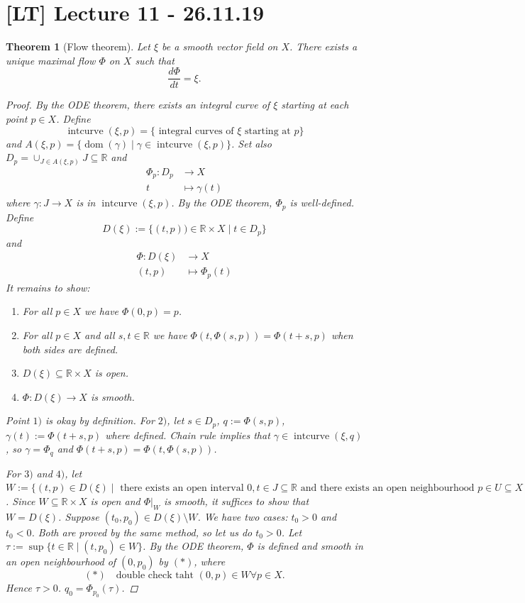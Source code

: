\documentclass[12pt]{article}
\theoremstyle{darkgreentheorem}
\newtheorem{thm}{Theorem}[section]
\theoremstyle{darkbluedefinition}
\theoremstyle{darkredexample}
\theoremstyle{remark}
\newcommand{\R}{\mathbb{R}}
\newcommand{\1}{\mathbbm{1}}
\newcommand{\tms}{\times}
\newcommand{\sub}{\subseteq}
\begin{document}
\section{[LT] Lecture 11 - 26.11.19}

\begin{thm}[Flow theorem]
    Let $\xi$ be a smooth vector field on $X$.
    There exists a unique maximal flow $\Phi$ on $X$ such that
    \[ \frac{d\Phi}{dt}=\xi .\]
    \begin{proof}
	By the ODE theorem, there exists an integral curve of $\xi$ starting at each point $p\in X$.
	Define
	\[ \operatorname{intcurve}(\xi,p)=\{ \text{ integral curves of }\xi\text{ starting at }p\} \]
	and $A(\xi,p)=\{\operatorname{dom}(\gamma)\mid \gamma\in \operatorname{intcurve}(\xi,p)\}$.
	Set also $D_{p}=\cup_{J\in A(\xi,p)}J \sub \R$ and
	\begin{align*}
	    \Phi_{p} \colon D_{p} & \to X \\
	    t & \mapsto \gamma(t) 
	\end{align*}
	where $\gamma\colon J\to X$ is in $\operatorname{intcurve}(\xi,p)$.
	By the ODE theorem, $\Phi_{p}$ is well-defined.
	Define
	\[ D(\xi):=\{ (t,p))\in \R\tms X\mid t\in D_{p} \}\]
	and
	\begin{align*}
	    \Phi\colon D(\xi) & \to X \\
	    (t,p) & \mapsto \Phi_{p}(t)
	\end{align*}
	It remains to show:
	\begin{enumerate}
	    \item For all $p\in X$ we have $\Phi(0,p)=p$.
	    \item For all $p\in X$ and all $s,t\in \R$ we have $\Phi(t,\Phi(s,p))=\Phi(t+s,p)$ when both sides are defined.
	    \item $D(\xi)\sub \R\tms X$ is open.
	    \item $\Phi\colon D(\xi)\to X$ is smooth.
	\end{enumerate}
	Point $1)$ is okay by definition.
	For $2)$, let $s\in D_{p}$, $q:=\Phi(s,p)$, $\gamma(t):=\Phi(t+s,p)$ where defined.
	Chain rule implies that $\gamma\in \operatorname{intcurve}(\xi,q)$, so $\gamma=\Phi_{q}$ and $\Phi(t+s,p)=\Phi(t,\Phi(s,p))$.

	For $3)$ and $4)$, let $W:=\{ (t,p)\in D(\xi)\mid \text{ there exists an open interval }0,t\in J\sub \R\text{ and there exists an open neighbourhood }p\in U\sub X \text{ such that } \Phi \text{ is defined and smooth on }J\tms U \}$.
	Since $W\sub \R\tms X$ is open and $\Phi|_{W}$ is smooth, it suffices to show that $W=D(\xi)$.
	Suppose $(t_{0},p_{0})\in D(\xi)\setminus W$.
	We have two cases: $t_{0}>0$ and $t_{0}<0$.
	Both are proved by the same method, so let us do $t_{0}>0$.
	Let $\tau:=\sup\{t\in \R\mid (t,p_{0})\in W \}$.
	By the ODE theorem, $\Phi$ is defined and smooth in an open neighbourhood of $(0,p_{0})$ by $(*)$, where
	\[ (*)\quad \text{double check taht }(0,p)\in W \forall p\in X.\]
	Hence $\tau>0$.
	$q_{0}=\Phi_{p_{0}}(\tau)$.


\end{proof}
\end{thm}
\end{document}
